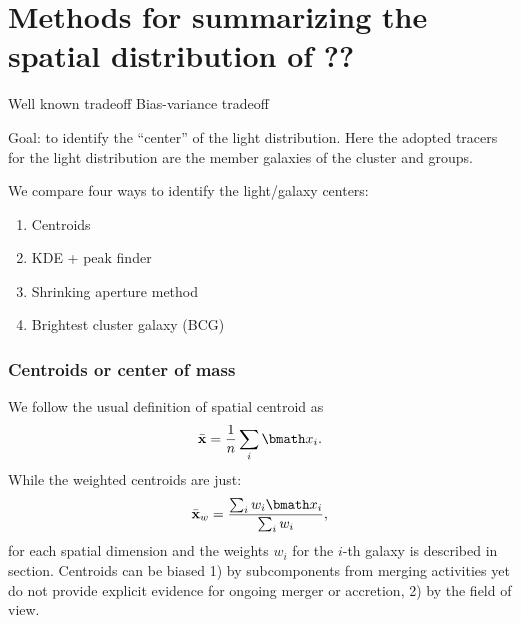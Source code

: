 \documentclass[usenatbib]{mn2e}
\renewcommand{\vec}[1]{ {\bmath #1} }
\begin{document}

\section{Methods for summarizing the spatial distribution of ??}

Well known tradeoff Bias-variance tradeoff



Goal: to identify the ``center'' of the light distribution. Here the adopted tracers for the light distribution are the member galaxies of the cluster and groups.

We compare four ways to identify the light/galaxy centers:
\begin{enumerate}
\item Centroids
\item KDE + peak finder
\item Shrinking aperture method
\item Brightest cluster galaxy (BCG)

\end{enumerate}

\subsubsection{Centroids or center of mass}
\label{Unweighted}
We follow the usual definition of spatial centroid as 
\begin{equation}
	\bar{\bf x} = \frac{1}{n} \sum_i \vec{x}_i. 
\end{equation}
While the weighted centroids are just: 
\begin{equation}
	\bar{\bf x}_w = \frac{\sum_i w_i \vec{x}_i}{\sum_i w_i},
\end{equation}
for each spatial dimension and the weights $w_i$ for the $i$-th galaxy
is described in section.
Centroids can be biased 1) by subcomponents from merging activities yet do
not provide explicit evidence for ongoing merger or accretion, 2) by the 
field of view.
\end{document}
